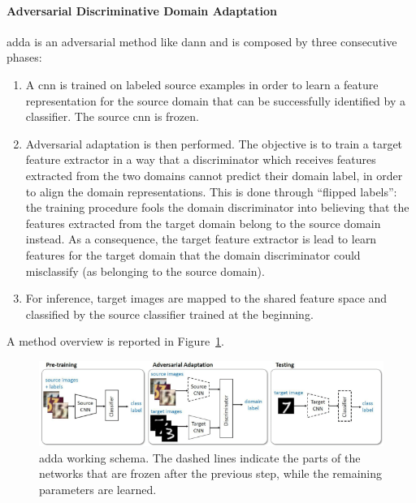\documentclass[%
    corpo=12pt,
    twoside,
    stile=classica,   
    tipotesi=magistrale,
    evenboxes,
    english
]{toptesi}
\begin{document}
\paragraph{Adversarial Discriminative Domain Adaptation}\label{sec:adda}
\acrshort{adda}\cite{tzeng2017adversarial} is an adversarial method like \gls{dann} and is composed by three consecutive phases:
\begin{enumerate}
	\item A \gls{cnn} is trained on labeled source examples in order to learn a feature representation for the source domain that can be successfully identified by a classifier. The source \gls{cnn} is frozen.
	\item Adversarial adaptation is then performed. The objective is to train a target feature extractor in a way that a discriminator which receives features extracted from the two domains cannot predict their domain label, in order to align the domain representations. This is done through \textquotedblleft flipped labels\textquotedblright : the training procedure fools the domain discriminator into believing that the features ex\-trac\-ted from the target domain belong to the source domain instead. As a consequence, the target feature extractor is lead to learn features for the target domain that the domain discriminator could misclassify (as belonging to the source domain).
	\item For inference, target images are mapped to the shared feature space and classified by the source classifier trained at the beginning.
\end{enumerate}
A method overview is reported in Figure~\ref{fig:adda}.

\begin{figure}[ht!]
	\centering
	\includegraphics[width=0.8\linewidth]{imgs/adda.png}
	\caption{\acrshort{adda} working schema\cite{tzeng2017adversarial}. The dashed lines indicate the parts of the networks that are frozen after the previous step, while the remaining parameters are learned.}
	\label{fig:adda}
\end{figure}

\end{document}
